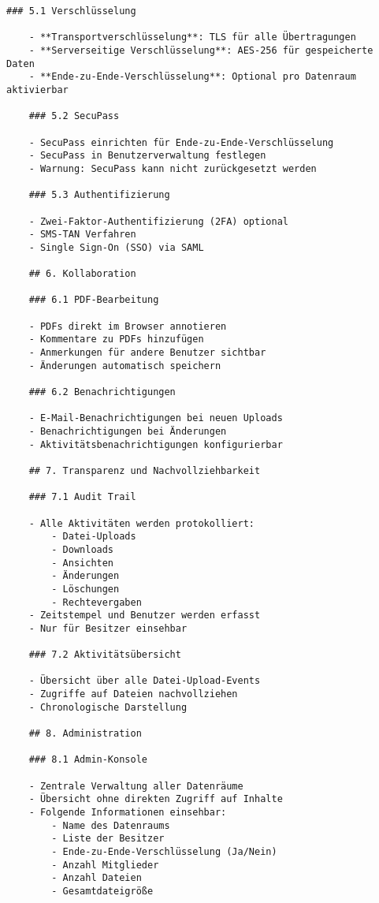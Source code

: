 \begin{Verbatim}[breaklines=true]
    ### 5.1 Verschlüsselung
    
    - **Transportverschlüsselung**: TLS für alle Übertragungen
    - **Serverseitige Verschlüsselung**: AES-256 für gespeicherte Daten
    - **Ende-zu-Ende-Verschlüsselung**: Optional pro Datenraum aktivierbar
    
    ### 5.2 SecuPass
    
    - SecuPass einrichten für Ende-zu-Ende-Verschlüsselung
    - SecuPass in Benutzerverwaltung festlegen
    - Warnung: SecuPass kann nicht zurückgesetzt werden
    
    ### 5.3 Authentifizierung
    
    - Zwei-Faktor-Authentifizierung (2FA) optional
    - SMS-TAN Verfahren
    - Single Sign-On (SSO) via SAML
    
    ## 6. Kollaboration
    
    ### 6.1 PDF-Bearbeitung
    
    - PDFs direkt im Browser annotieren
    - Kommentare zu PDFs hinzufügen
    - Anmerkungen für andere Benutzer sichtbar
    - Änderungen automatisch speichern
    
    ### 6.2 Benachrichtigungen
    
    - E-Mail-Benachrichtigungen bei neuen Uploads
    - Benachrichtigungen bei Änderungen
    - Aktivitätsbenachrichtigungen konfigurierbar
    
    ## 7. Transparenz und Nachvollziehbarkeit
    
    ### 7.1 Audit Trail
    
    - Alle Aktivitäten werden protokolliert:
        - Datei-Uploads
        - Downloads
        - Ansichten
        - Änderungen
        - Löschungen
        - Rechtevergaben
    - Zeitstempel und Benutzer werden erfasst
    - Nur für Besitzer einsehbar
    
    ### 7.2 Aktivitätsübersicht
    
    - Übersicht über alle Datei-Upload-Events
    - Zugriffe auf Dateien nachvollziehen
    - Chronologische Darstellung
    
    ## 8. Administration
    
    ### 8.1 Admin-Konsole
    
    - Zentrale Verwaltung aller Datenräume
    - Übersicht ohne direkten Zugriff auf Inhalte
    - Folgende Informationen einsehbar:
        - Name des Datenraums
        - Liste der Besitzer
        - Ende-zu-Ende-Verschlüsselung (Ja/Nein)
        - Anzahl Mitglieder
        - Anzahl Dateien
        - Gesamtdateigröße
    

\end{Verbatim}
